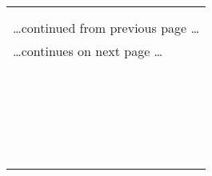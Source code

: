 \documentclass{article}
\begin{document}
\begin{longtable}{|p{}|}
\hline
\rowcolor{openvas_log}{\color{white}{Log (CVSS: 0.0) }}\\
\rowcolor{openvas_log}{\color{white}{NVT: Check for SSL Ciphers}}\\
\hline
\endfirsthead
\hfill\ldots continued from previous page \ldots \\
\hline
\endhead
\hline
\ldots continues on next page \ldots \\
\endfoot
\hline
\endlastfoot
\\
\rowcolor{white}{\verb=Service supports SSLv2 ciphers.=}\\
\rowcolor{white}{\verb=Service supports SSLv3 ciphers.=}\\
\rowcolor{white}{\verb=Service supports TLSv1 ciphers.=}\\
\rowcolor{white}{\verb=Medium ciphers offered by this service:=}\\
\rowcolor{white}{\verb=  SSL3_RSA_DES_192_CBC3_SHA=}\\
\rowcolor{white}{\verb=  SSL3_EDH_RSA_DES_192_CBC3_SHA=}\\
\rowcolor{white}{\verb=  SSL3_ADH_DES_192_CBC_SHA=}\\
\rowcolor{white}{\verb=  SSL3_DHE_RSA_WITH_AES_128_SHA=}\\
\rowcolor{white}{\verb=  SSL3_ADH_WITH_AES_128_SHA=}\\
\rowcolor{white}{\verb=  TLS1_RSA_DES_192_CBC3_SHA=}\\
\rowcolor{white}{\verb=  TLS1_EDH_RSA_DES_192_CBC3_SHA=}\\
\rowcolor{white}{\verb=  TLS1_ADH_DES_192_CBC_SHA=}\\
\rowcolor{white}{\verb=  TLS1_DHE_RSA_WITH_AES_128_SHA=}\\
\rowcolor{white}{\verb=  TLS1_ADH_WITH_AES_128_SHA=}\\
\rowcolor{white}{\verb=Weak ciphers offered by this service:=}\\
\rowcolor{white}{\verb=  SSL3_RSA_RC4_40_MD5=}\\
\rowcolor{white}{\verb=  SSL3_RSA_RC4_128_MD5=}\\
\rowcolor{white}{\verb=  SSL3_RSA_RC4_128_SHA=}\\
\rowcolor{white}{\verb=  SSL3_RSA_RC2_40_MD5=}\\
\rowcolor{white}{\verb=  SSL3_RSA_DES_40_CBC_SHA=}\\
\rowcolor{white}{\verb=  SSL3_EDH_RSA_DES_40_CBC_SHA=}\\

\end{longtable}
\end{document}
